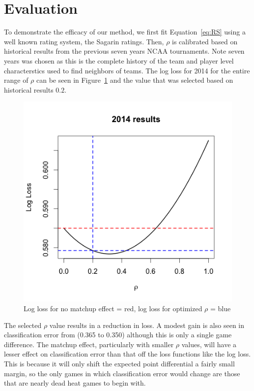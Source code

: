 \section{Evaluation}
To demonstrate the efficacy of our method, we first fit Equation~\ref{eq:RS} using a well known rating system, the Sagarin ratings.  Then, $\rho$ is calibrated based on historical results from the previous seven years NCAA tournaments.  Note seven years was chosen as this is the complete history of the team and player level characterstics used to find neighbors of teams.   The log loss for 2014 for the entire range of $\rho$ can be seen in Figure~\ref{fig:result} and the value that was selected based on historical results $0.2$.
\begin{figure}[h]
\includegraphics[width=1\textwidth]{results_2014.png}
\caption{Log loss for no matchup effect = red, log loss for optimized $\rho$ = blue}
\label{fig:result}
\end{figure}

The selected $\rho$ value results in a reduction in loss.  A modest gain is also seen in classification error from (0.365 to 0.350) although this is only a single game difference.  The matchup effect, particularly with smaller $\rho$ values, will have a lesser effect on classification error than that off the loss functions like the log loss.  This is because it will only shift the expected point differential a fairly small margin, so the only games in which classification error would change are those that are nearly dead heat games to begin with.

